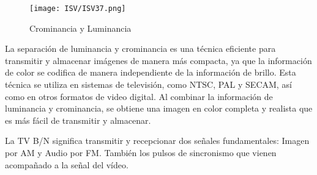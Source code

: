 \documentclass[
	12pt, %
	fleqn, %
	a4paper, %
	oneside, %
]{LegrandOrangeBook}
\begin{document}
\begin{figure}[H]
\centering
\texttt{[image: ISV/ISV37.png]}
\caption{Crominancia y Luminancia}
\end{figure}
La separación de luminancia y crominancia es una técnica eficiente para transmitir y almacenar imágenes de manera más compacta, ya que la información de color se codifica de manera independiente de la información de brillo. Esta técnica se utiliza en sistemas de televisión, como NTSC, PAL y SECAM, así como en otros formatos de video digital. Al combinar la información de luminancia y crominancia, se obtiene una imagen en color completa y realista que es más fácil de transmitir y almacenar.
\begin{remark}
La TV B/N significa transmitir y recepcionar dos señales fundamentales: Imagen por AM y Audio por FM. También los pulsos de sincronismo que vienen acompañado a la señal del vídeo.
\end{remark}
\end{document}
